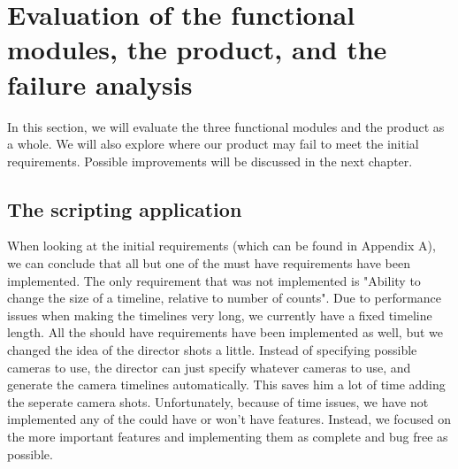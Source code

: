 \section{Evaluation of the functional modules, the product, and the failure analysis}

In this section, we will evaluate the three functional modules and the product as a whole. We will also explore where our product may fail to meet the initial requirements. Possible improvements will be discussed in the next chapter.\\

\subsection{The scripting application}
When looking at the initial requirements (which can be found in Appendix A), we can conclude that all but one of the must have requirements have been implemented. The only requirement that was not implemented is "Ability to change the size of a timeline, relative to number of counts". Due to performance issues when making the timelines very long, we currently have a fixed timeline length. All the should have requirements have been implemented as well, but we changed the idea of the director shots a little. Instead of specifying possible cameras to use, the director can just specify whatever cameras to use, and generate the camera timelines automatically. This saves him a lot of time adding the seperate camera shots. Unfortunately, because of time issues, we have not implemented any of the could have or won't have features. Instead, we focused on the more important features and implementing them as complete and bug free as possible.

